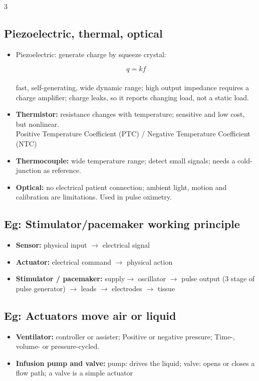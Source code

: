 \documentclass[10pt,a4paper]{ctexart}
\newcommand{\key}[1]{\textbf{#1}}
\newcommand{\formula}[1]{%
  \par\vspace{1pt}%
  \begingroup
  \setlength{\abovedisplayskip}{0pt}%
  \setlength{\belowdisplayskip}{0pt}%
  \[
    #1
  \]
  \endgroup
  \vspace{1pt}%
}
\begin{document}
\begin{multicols*}{3}
\subsection{Piezoelectric, thermal, optical}
\begin{itemize}
  \item Piezoelectric: generate charge by squeeze crystal:
  \formula{\displaystyle q=kf}\\
  fast, self-generating, wide dynamic range; high output impedance requires
  a charge amplifier; charge leaks, so it reports changing load, not a static load.
  \item \key{Thermistor:} resistance changes with temperature; sensitive and low cost, but nonlinear. \\
  Positive Temperature Coefficient (PTC) / Negative Temperature Coefficient (NTC)
  \item \key{Thermocouple:} wide temperature range; detect small signals; needs a cold-junction as reference.
  \item \key{Optical:} no electrical patient connection; ambient light, motion and calibration are limitations. 
  Used in pulse oximetry.
\end{itemize}

\subsection{Eg: Stimulator/pacemaker working principle}
\begin{itemize}
    \item \key{Sensor:} physical input $\rightarrow$ electrical signal
    \item \key{Actuator:} electrical command $\rightarrow$ physical action
    \item \key{Stimulator / pacemaker:} supply$\rightarrow$ oscillator $\rightarrow$ pulse output (3 stage of pulse generator)
    $\rightarrow$ leads $\rightarrow$ electrodes $\rightarrow$ tissue
\end{itemize}

\subsection{Eg: Actuators move air or liquid}
\begin{itemize}
    \item \key{Ventilator:} controller or assister; Positive or negative pressure; Time-, volume- or pressure-cycled.
    \item \key{Infusion pump and valve:} pump: drives the liquid; valve: opens or closes a flow path; a valve is a simple actuator\\
\end{itemize}



\end{multicols*}
\end{document}
